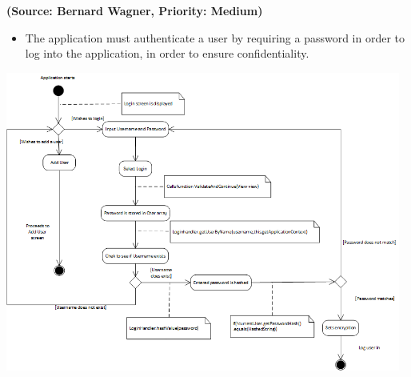 \begin{itemize}
\textbf{(Source: Bernard Wagner, Priority: Medium)}
\begin{itemize}
\item The application must authenticate a user by requiring a password in order to log into the application, in order to ensure confidentiality.
\end{itemize}
 \includegraphics[width=13cm]{diagrams/StateDiagrams/LocalAuthenticationStateDiagram.png}
\end{itemize}
